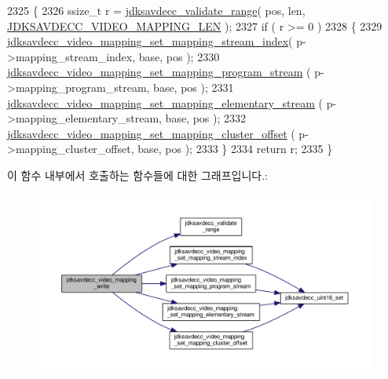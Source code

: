 \begin{DoxyCode}
2325 \{
2326     ssize\_t r = \hyperlink{group__util_ga9c02bdfe76c69163647c3196db7a73a1}{jdksavdecc\_validate\_range}( pos, len, 
      \hyperlink{group__video__mapping_gabf764135c5b516f8e5017b4060faef0f}{JDKSAVDECC\_VIDEO\_MAPPING\_LEN} );
2327     \textcolor{keywordflow}{if} ( r >= 0 )
2328     \{
2329         \hyperlink{group__video__mapping_ga00c997fcbc630af09b5c8dbb5eac39ee}{jdksavdecc\_video\_mapping\_set\_mapping\_stream\_index}(
       p->mapping\_stream\_index, base, pos );
2330         \hyperlink{group__video__mapping_ga02cc3d925b3c5cef4be33ccf44ccac48}{jdksavdecc\_video\_mapping\_set\_mapping\_program\_stream}
      ( p->mapping\_program\_stream, base, pos );
2331         \hyperlink{group__video__mapping_ga4ef9ae045e06fe1aa6275af9c7bc1f31}{jdksavdecc\_video\_mapping\_set\_mapping\_elementary\_stream}
      ( p->mapping\_elementary\_stream, base, pos );
2332         \hyperlink{group__video__mapping_ga32152a52baa0793811420db284a10a92}{jdksavdecc\_video\_mapping\_set\_mapping\_cluster\_offset}
      ( p->mapping\_cluster\_offset, base, pos );
2333     \}
2334     \textcolor{keywordflow}{return} r;
2335 \}
\end{DoxyCode}


이 함수 내부에서 호출하는 함수들에 대한 그래프입니다.\+:
\nopagebreak
\begin{figure}[H]
\begin{center}
\leavevmode
\includegraphics[width=350pt]{group__video__mapping_gab8e55cf5e042fc4bc0ad45d6fe8fcf20_cgraph}
\end{center}
\end{figure}


